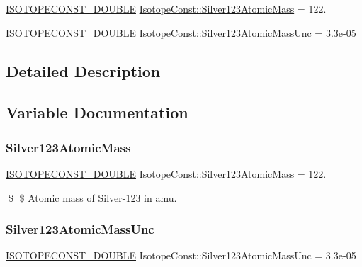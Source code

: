 \begin{DoxyCompactItemize}
\item 
\mbox{\hyperlink{group___isotope_const-_macros_ga8f45a7272ce02c0b4c65c44636ed719a}{I\+S\+O\+T\+O\+P\+E\+C\+O\+N\+S\+T\+\_\+\+D\+O\+U\+B\+LE}} \mbox{\hyperlink{group___isotope_const-_silver-_ag123_gabdf89275c35e1fe27a89f1e4ebf1d7a1}{Isotope\+Const\+::\+Silver123\+Atomic\+Mass}} = 122.
\item 
\mbox{\hyperlink{group___isotope_const-_macros_ga8f45a7272ce02c0b4c65c44636ed719a}{I\+S\+O\+T\+O\+P\+E\+C\+O\+N\+S\+T\+\_\+\+D\+O\+U\+B\+LE}} \mbox{\hyperlink{group___isotope_const-_silver-_ag123_gab612e2367b0c73d33a618d62bf2e7563}{Isotope\+Const\+::\+Silver123\+Atomic\+Mass\+Unc}} = 3.\+3e-\/05
\end{DoxyCompactItemize}


\subsection{Detailed Description}


\subsection{Variable Documentation}
\mbox{\label{group___isotope_const-_silver-_ag123_gabdf89275c35e1fe27a89f1e4ebf1d7a1}} 
\subsubsection{\texorpdfstring{Silver123\+Atomic\+Mass}{Silver123AtomicMass}}
{\footnotesize\ttfamily \mbox{\hyperlink{group___isotope_const-_macros_ga8f45a7272ce02c0b4c65c44636ed719a}{I\+S\+O\+T\+O\+P\+E\+C\+O\+N\+S\+T\+\_\+\+D\+O\+U\+B\+LE}} Isotope\+Const\+::\+Silver123\+Atomic\+Mass = 122.}

\$ \$ Atomic mass of Silver-\/123 in amu. \mbox{\label{group___isotope_const-_silver-_ag123_gab612e2367b0c73d33a618d62bf2e7563}} 
\subsubsection{\texorpdfstring{Silver123\+Atomic\+Mass\+Unc}{Silver123AtomicMassUnc}}
{\footnotesize\ttfamily \mbox{\hyperlink{group___isotope_const-_macros_ga8f45a7272ce02c0b4c65c44636ed719a}{I\+S\+O\+T\+O\+P\+E\+C\+O\+N\+S\+T\+\_\+\+D\+O\+U\+B\+LE}} Isotope\+Const\+::\+Silver123\+Atomic\+Mass\+Unc = 3.\+3e-\/05}

